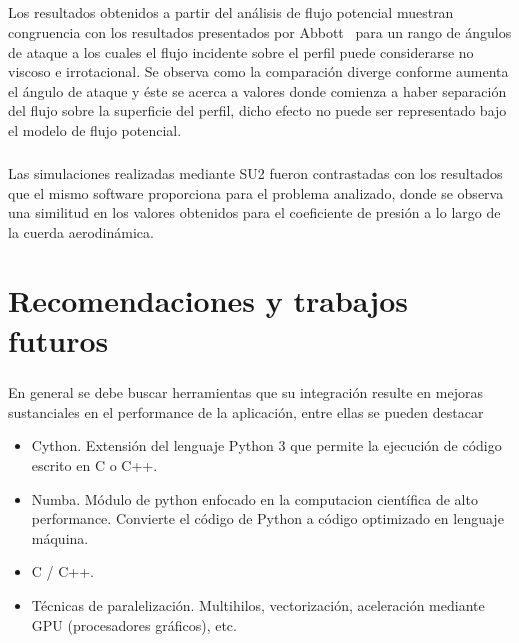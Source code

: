 \documentclass[letterpaper, openright, 12pt]{book}
\begin{document}
\paragraph*{}
    Los resultados obtenidos a partir del análisis de flujo potencial muestran
    congruencia con los resultados presentados por Abbott~\cite{abbott} para un
    rango de ángulos de ataque a los cuales el flujo incidente sobre el perfil
    puede considerarse no viscoso e irrotacional. Se observa como la
    comparación diverge conforme aumenta el ángulo de ataque y éste se acerca a
    valores donde comienza a haber separación del flujo sobre la superficie del
    perfil, dicho efecto no puede ser representado bajo el modelo de flujo
    potencial.

\paragraph*{}
    Las simulaciones realizadas mediante SU2 fueron contrastadas con los
    resultados que el mismo software proporciona para el problema analizado,
    donde se observa una similitud en los valores obtenidos para el coeficiente
    de presión a lo largo de la cuerda aerodinámica.

%
%
%
%
%

%
%
%
%
%
\chapter{Recomendaciones y trabajos futuros}
\paragraph*{}
    En general se debe buscar herramientas que su integración resulte en
    mejoras sustanciales en el performance de la aplicación, entre ellas se
    pueden destacar
    \begin{itemize}
            \item Cython. Extensión del lenguaje Python 3 que permite la
                ejecución de código escrito en C o C++.
            \item Numba. Módulo de python enfocado en la computacion
                científica de alto performance. Convierte el código de Python
                a código optimizado en lenguaje máquina.  \item C / C++.
            \item Técnicas de paralelización. Multihilos, vectorización,
                aceleración mediante GPU (procesadores gráficos), etc.
    \end{itemize}
\end{document}
